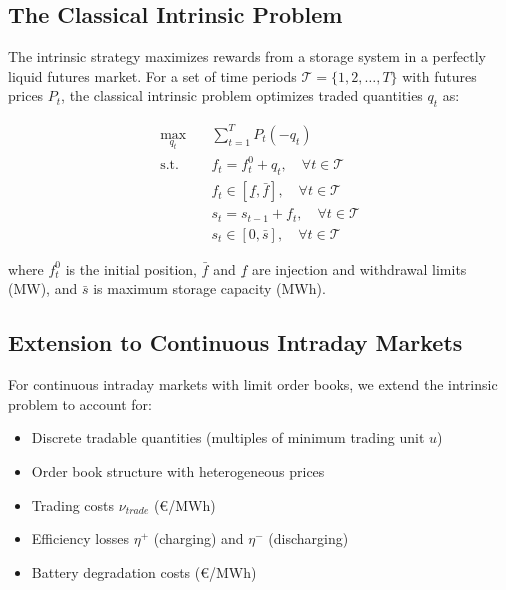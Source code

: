 \documentclass[10pt,twocolumn]{article}
\begin{document}
\subsection{The Classical Intrinsic Problem}

The intrinsic strategy maximizes rewards from a storage system in a perfectly liquid futures market. For a set of time periods $\mathcal{T} = \{1, 2, \ldots, T\}$ with futures prices $P_t$, the classical intrinsic problem optimizes traded quantities $q_t$ as:

\begin{subequations}
\begin{align}
\max_{q_t} \quad & \sum_{t=1}^T P_t(-q_t) \label{eq:intrinsic_obj} \\
\text{s.t.} \quad & f_t = f_t^0 + q_t, \quad \forall t \in \mathcal{T} \label{eq:position_update} \\
& f_t \in [\underline{f}, \bar{f}], \quad \forall t \in \mathcal{T} \label{eq:power_limits} \\
& s_t = s_{t-1} + f_t, \quad \forall t \in \mathcal{T} \label{eq:storage_evolution} \\
& s_t \in [0, \bar{s}], \quad \forall t \in \mathcal{T} \label{eq:storage_limits}
\end{align}
\label{eq:classical_intrinsic}
\end{subequations}

where $f_t^0$ is the initial position, $\bar{f}$ and $\underline{f}$ are injection and withdrawal limits (MW), and $\bar{s}$ is maximum storage capacity (MWh).

\subsection{Extension to Continuous Intraday Markets}

For continuous intraday markets with limit order books, we extend the intrinsic problem to account for:
\begin{itemize}
\item Discrete tradable quantities (multiples of minimum trading unit $u$)
\item Order book structure with heterogeneous prices
\item Trading costs $\nu_{trade}$ (€/MWh)
\item Efficiency losses $\eta^+$ (charging) and $\eta^-$ (discharging)
\item Battery degradation costs (€/MWh)
\end{itemize}
\end{document}
